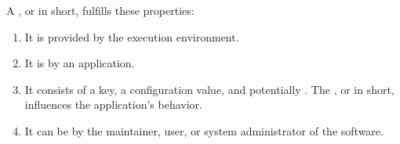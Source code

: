 \begin{definition}
\label{def:configuration-setting}
A ,
or  in short,
fulfills these properties:
\begin{enumerate}
\item
It is provided by the execution environment.
\item
It is  by an application.
\item
It consists of a key, a configuration value, and potentially .
The , or  in short, influences the application's behavior.
\item
It can be  by the maintainer, user, or system administrator of the software.
\end{enumerate}
\end{definition}
